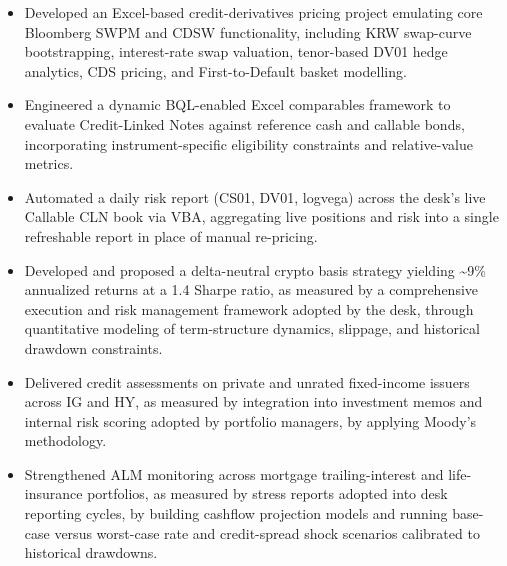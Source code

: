 \documentclass{article}
\begin{document}
\begin{itemize}
  \item Developed an Excel-based credit-derivatives pricing project emulating core Bloomberg SWPM and CDSW functionality, including KRW swap-curve bootstrapping, interest-rate swap valuation, tenor-based DV01 hedge analytics, CDS pricing, and First-to-Default basket modelling.
  \item Engineered a dynamic BQL-enabled Excel comparables framework to evaluate Credit-Linked Notes against reference cash and callable bonds, incorporating instrument-specific eligibility constraints and relative-value metrics.
  \item Automated a daily risk report (CS01, DV01, logvega) across the desk's live Callable CLN book via VBA, aggregating live positions and risk into a single refreshable report in place of manual re-pricing.
\end{itemize}
\entrygap
{}
\begin{itemize}
  \item Developed and proposed a delta-neutral crypto basis strategy yielding \textasciitilde{}9\% annualized returns at a 1.4 Sharpe ratio, as measured by a comprehensive execution and risk management framework adopted by the desk, through quantitative modeling of term-structure dynamics, slippage, and historical drawdown constraints.
  \item Delivered credit assessments on private and unrated fixed-income issuers across IG and HY, as measured by integration into investment memos and internal risk scoring adopted by portfolio managers, by applying Moody's methodology.
  \item Strengthened ALM monitoring across mortgage trailing-interest and life-insurance portfolios, as measured by stress reports adopted into desk reporting cycles, by building cashflow projection models and running base-case versus worst-case rate and credit-spread shock scenarios calibrated to historical drawdowns.
\end{itemize}
\entrygap
{}
\end{document}
